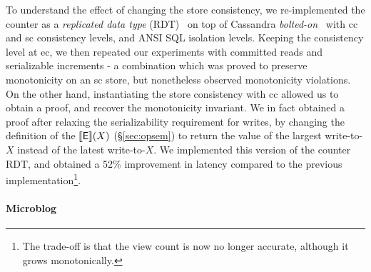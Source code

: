 To understand the effect of changing the store consistency, we
re-implemented the counter as a \emph{replicated data type}
(RDT)~\cite{crdt,burckhardt14} on top of Cassandra
\emph{bolted-on}~\cite{bailisbolton} with {\sc cc} and {\sc sc}
consistency levels, and ANSI SQL isolation levels. Keeping the
consistency level at {\sc ec}, we then repeated our experiments with
committed reads and serializable increments - a combination which was
proved to preserve monotonicity on an {\sc sc} store, but nonetheless
observed monotonicity violations. On the other hand, instantiating the
store consistency with {\sc cc} allowed us to obtain a proof, and
recover the monotonicity invariant. We in fact obtained a proof after
relaxing the serializability requirement for writes, by changing the
definition of the $\llbracket \textsf{E} \rrbracket(X)$ (\S\ref{sec:opsem}) to return the
value of the largest write-to-$X$ instead of the latest write-to-$X$.
We implemented this version of the counter RDT, and obtained a 52\%
improvement in latency compared to the previous
implementation\footnote{The trade-off is that the view count is now no
longer accurate, although it grows monotonically.}.

\paragraph{Microblog}

